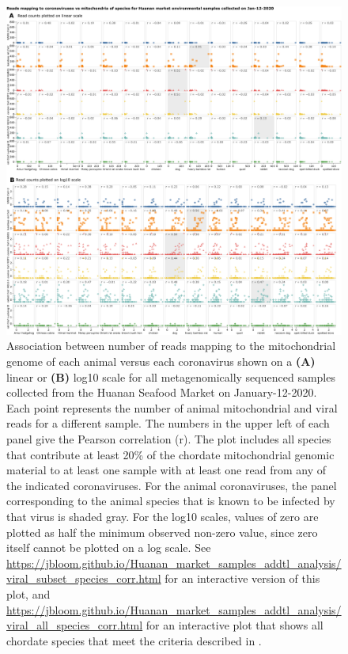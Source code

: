 \documentclass[9pt,twocolumn,twoside]{gsajnl_modified}
\begin{document}
\begin{figure}
\includegraphics[width=\linewidth]{figures/viral_subset_species_corr.png}
\caption{
Association between number of reads mapping to the mitochondrial genome of each animal versus each coronavirus shown on a {\bf (A)} linear or {\bf (B)} log10 scale for all metagenomically sequenced samples collected from the Huanan Seafood Market on January-12-2020.
Each point represents the number of animal mitochondrial and viral reads for a different sample.
The numbers in the upper left of each panel give the Pearson correlation (r).
The plot includes all species that contribute at least 20\% of the chordate mitochondrial genomic material to at least one sample with at least one read from any of the indicated coronaviruses.
For the animal coronaviruses, the panel corresponding to the animal species that is known to be infected by that virus is shaded gray.
For the log10 scales, values of zero are plotted as half the minimum observed non-zero value, since zero itself cannot be plotted on a log scale.
See \url{https://jbloom.github.io/Huanan_market_samples_addtl_analysis/viral_subset_species_corr.html} for an interactive version of this plot, and \url{https://jbloom.github.io/Huanan_market_samples_addtl_analysis/viral_all_species_corr.html} for an interactive plot that shows all chordate species that meet the criteria described in \cite{bloom2023association}.
\label{fig:viral_species_corr}
}
\end{figure}
\end{document}
